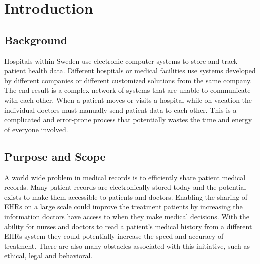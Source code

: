 \documentclass[14pt]{article}
\begin{document}
\newpage

\tableofcontents

\newpage

%
%
%

\section{Introduction}
\label{sec:Introduction}

\subsection{Background}
Hospitals within Sweden use electronic computer systems to store and track patient health data. Different hospitals or medical facilities use systems developed by different companies or different customized solutions from the same company. The end result is a complex network of systems that are unable to communicate with each other. When a patient moves or visits a hospital while on vacation the individual doctors must manually send patient data to each other. This is a complicated and error-prone process that potentially wastes the time and energy of everyone involved.




\subsection{Purpose and Scope}
A world wide problem in medical records is to efficiently share patient medical records. Many patient records are electronically stored today and the potential exists to make them accessible to patients and doctors. Enabling the sharing of \glspl{EHR} on a large scale could improve the treatment patients by increasing the information doctors have access to when they make medical decisions. With the ability for nurses and doctors to read a patient's medical history from a different \glspl{EHR} system they could potentially increase the speed and accuracy of treatment. There are also many obstacles associated with this initiative, such as ethical, legal and behavioral.
\end{document}
